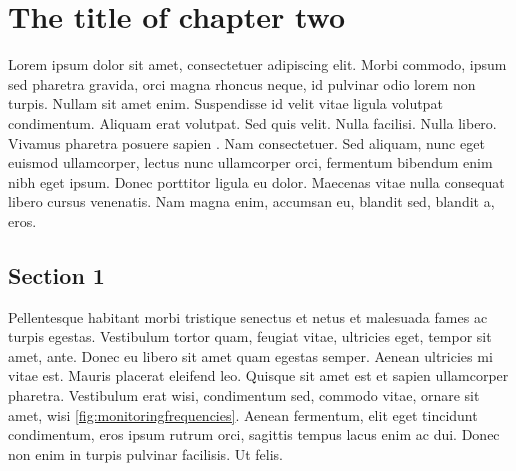 \chapter{The title of chapter two}

Lorem ipsum dolor sit amet, consectetuer adipiscing elit. Morbi commodo, ipsum sed pharetra gravida, orci magna rhoncus neque, id pulvinar odio lorem non turpis. Nullam sit amet enim. Suspendisse id velit vitae ligula volutpat condimentum. Aliquam erat volutpat. Sed quis velit. Nulla facilisi. Nulla libero. Vivamus pharetra posuere sapien \cite{hartley2003multiple}. Nam consectetuer. Sed aliquam, nunc eget euismod ullamcorper, lectus nunc ullamcorper orci, fermentum bibendum enim nibh eget ipsum. Donec porttitor ligula eu dolor. Maecenas vitae nulla consequat libero cursus venenatis. Nam magna enim, accumsan eu, blandit sed, blandit a, eros.

\section{Section 1}
Pellentesque habitant morbi tristique senectus et netus et malesuada fames ac turpis egestas. Vestibulum tortor quam, feugiat vitae, ultricies eget, tempor sit amet, ante. Donec eu libero sit amet quam egestas semper. Aenean ultricies mi vitae est. Mauris placerat eleifend leo. Quisque sit amet est et sapien ullamcorper pharetra. Vestibulum erat wisi, condimentum sed, commodo vitae, ornare sit amet, wisi \ref{fig:monitoringfrequencies}. Aenean fermentum, elit eget tincidunt condimentum, eros ipsum rutrum orci, sagittis tempus lacus enim ac dui. Donec non enim in turpis pulvinar facilisis. Ut felis.

